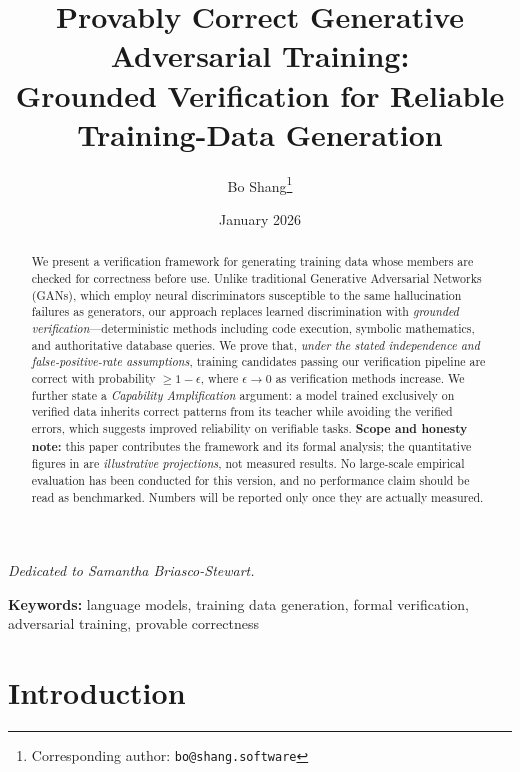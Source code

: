 \documentclass[11pt,a4paper]{article}
\title{
    \textbf{Provably Correct Generative Adversarial Training:\\
    Grounded Verification for Reliable Training-Data Generation}
}
\author[1]{Bo Shang\thanks{Corresponding author: \texttt{bo@shang.software}}}
\affil[1]{Erosolar AI Research}
\date{January 2026}
\begin{document}
\maketitle

\begin{center}
\textit{Dedicated to Samantha Briasco-Stewart.}
\end{center}

\begin{abstract}
We present a verification framework for generating training data whose members are checked for correctness before use. Unlike traditional Generative Adversarial Networks (GANs), which employ neural discriminators susceptible to the same hallucination failures as generators, our approach replaces learned discrimination with \emph{grounded verification}---deterministic methods including code execution, symbolic mathematics, and authoritative database queries. We prove that, \emph{under the stated independence and false-positive-rate assumptions}, training candidates passing our verification pipeline are correct with probability $\geq 1 - \epsilon$, where $\epsilon \to 0$ as verification methods increase. We further state a \emph{Capability Amplification} argument: a model trained exclusively on verified data inherits correct patterns from its teacher while avoiding the verified errors, which suggests improved reliability on verifiable tasks. \textbf{Scope and honesty note:} this paper contributes the framework and its formal analysis; the quantitative figures in  are \emph{illustrative projections}, not measured results. No large-scale empirical evaluation has been conducted for this version, and no performance claim should be read as benchmarked. Numbers will be reported only once they are actually measured.
\end{abstract}

\textbf{Keywords:} language models, training data generation, formal verification, adversarial training, provable correctness

\section{Introduction}
\label{sec:introduction}
\end{document}
